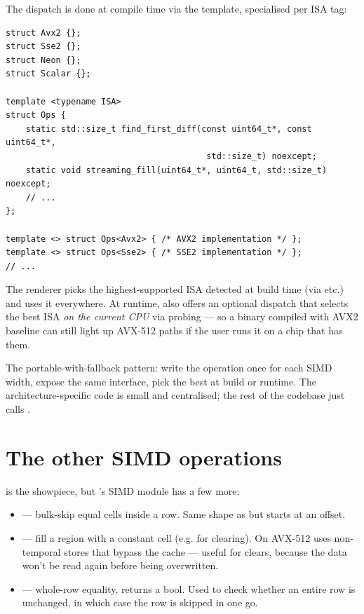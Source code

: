 The dispatch is done at compile time via the 
template, specialised per ISA tag:

\begin{lstlisting}
struct Avx2 {};
struct Sse2 {};
struct Neon {};
struct Scalar {};

template <typename ISA>
struct Ops {
    static std::size_t find_first_diff(const uint64_t*, const uint64_t*,
                                        std::size_t) noexcept;
    static void streaming_fill(uint64_t*, uint64_t, std::size_t) noexcept;
    // ...
};

template <> struct Ops<Avx2> { /* AVX2 implementation */ };
template <> struct Ops<Sse2> { /* SSE2 implementation */ };
// ...
\end{lstlisting}

The renderer picks the highest-supported ISA detected at build time
(via  etc.) and uses it everywhere.
At runtime, \maya{} also offers an optional dispatch that selects the
best ISA \emph{on the current CPU} via  probing --- so a
binary compiled with AVX2 baseline can still light up AVX-512 paths
if the user runs it on a chip that has them.

\begin{idea}
The portable-with-fallback pattern: write the operation once for each
SIMD width, expose the same interface, pick the best at build or
runtime. The architecture-specific code is small and centralised; the
rest of the codebase just calls .
\end{idea}

\section{The other SIMD operations}

 is the showpiece, but \maya{}'s SIMD module
has a few more:

\begin{itemize}[leftmargin=*]
  \item {} --- bulk-skip equal
    cells inside a row. Same shape as  but
    starts at an offset.
  \item {} --- fill a region
    with a constant cell (e.g. for clearing). On AVX-512 uses
    non-temporal stores that bypass the cache --- useful for clears,
    because the data won't be read again before being overwritten.
  \item {} --- whole-row equality, returns
    a bool. Used to check whether an entire row is unchanged, in
    which case the row is skipped in one go.
\end{itemize}

